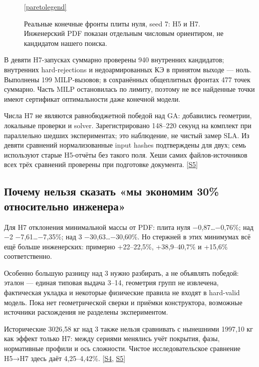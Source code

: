 \documentclass[11pt,a4paper]{article}
\begin{document}
\begin{figure}[H]
\par\smallskip\ref{paretolegend}
\caption{Реальные конечные фронты плиты нуля, seed 7: H5 и H7. Инженерский PDF показан отдельным числовым ориентиром, не кандидатом нашего поиска.}\label{fig:05_pareto}
\end{figure}

В девяти H7-запусках суммарно проверены 940 внутренних кандидатов; внутренних hard-rejections и недоармированных КЭ в принятом выходе — ноль. Выполнены 199 MILP-вызовов; в сохранённых общеплитных фронтах 477 точек суммарно. Часть MILP остановилась по лимиту, поэтому не все найденные точки имеют сертификат оптимальности даже конечной модели.


Числа H7 не являются равнобюджетной победой над GA: добавились геометрии, локальные проверки и solver. Зарегистрировано 148–220 секунд на комплект при параллельно шедших экспериментах; это наблюдение, не чистый замер SLA. Из девяти сравнений нормализованные input hashes подтверждены для двух; семь используют старые H5-отчёты без такого поля. Хеши самих файлов-источников всех трёх сравнений проверены при подготовке документа. {\color{Teal}\small[\hyperlink{S5}{S5}]}


\subsection{Почему нельзя сказать «мы экономим 30\% относительно инженера»}

Для H7 отклонения минимальной массы от PDF: плита нуля −0,87…−0,76\%; над −2 −7,61…−7,35\%; над 3 −30,63…−30,60\%. Но стержней в этих минимумах всё ещё больше инженерских: примерно +22–22,5\%, +38,9–40,7\% и +15,6\% соответственно.


Особенно большую разницу над 3 нужно разбирать, а не объявлять победой: эталон — единая типовая выдача 3–14, геометрия групп не извлечена, фактическая укладка и некоторые физические правила не входят в hard-valid модель. Пока нет геометрической сверки и приёмки конструктора, возможные источники расхождения не разделены экспериментом.


Исторические 3026,58 кг над 3 также нельзя сравнивать с нынешними 1997,10 кг как эффект только H7: между сериями менялись учёт покрытия, фазы, нормативные профили и ось сложности. Чистое исследовательское сравнение H5→H7 здесь даёт 4,25–4,42\%. {\color{Teal}\small[\hyperlink{S4}{S4}, \hyperlink{S5}{S5}]}
\end{document}
